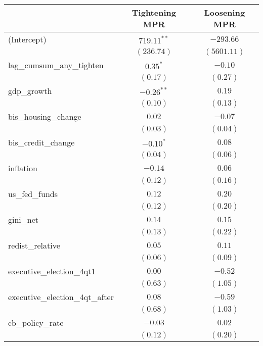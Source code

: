 
\begin{tabular}{l c c }
\hline
 & Tightening MPR & Loosening MPR \\
\hline
(Intercept)                     & $719.11^{**}$ & $-293.66$   \\
                                & $(236.74)$    & $(5601.11)$ \\
lag\_cumsum\_any\_tighten       & $0.35^{*}$    & $-0.10$     \\
                                & $(0.17)$      & $(0.27)$    \\
gdp\_growth                     & $-0.26^{**}$  & $0.19$      \\
                                & $(0.10)$      & $(0.13)$    \\
bis\_housing\_change            & $0.02$        & $-0.07$     \\
                                & $(0.03)$      & $(0.04)$    \\
bis\_credit\_change             & $-0.10^{*}$   & $0.08$      \\
                                & $(0.04)$      & $(0.06)$    \\
inflation                       & $-0.14$       & $0.06$      \\
                                & $(0.12)$      & $(0.16)$    \\
us\_fed\_funds                  & $0.12$        & $0.20$      \\
                                & $(0.12)$      & $(0.20)$    \\
gini\_net                       & $0.14$        & $0.15$      \\
                                & $(0.13)$      & $(0.22)$    \\
redist\_relative                & $0.05$        & $0.11$      \\
                                & $(0.06)$      & $(0.09)$    \\
executive\_election\_4qt1       & $0.00$        & $-0.52$     \\
                                & $(0.63)$      & $(1.05)$    \\
executive\_election\_4qt\_after & $0.08$        & $-0.59$     \\
                                & $(0.68)$      & $(1.03)$    \\
cb\_policy\_rate                & $-0.03$       & $0.02$      \\
                                & $(0.12)$      & $(0.20)$    \\

\end{tabular}
